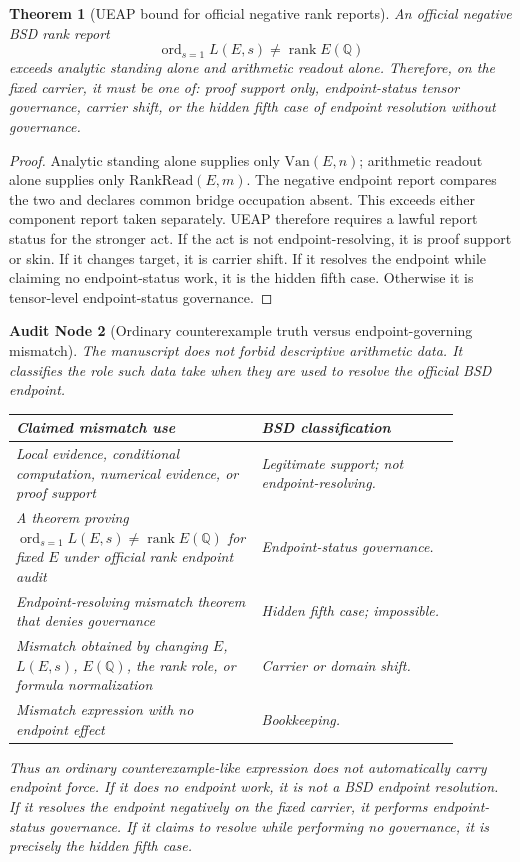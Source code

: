 \documentclass[11pt]{article}
\newtheorem{theorem}{Theorem}[section]
\newtheorem{audit}[theorem]{Audit Node}
\newcommand{\Q}{\mathbb{Q}}
\newcommand{\rank}{\operatorname{rank}}
\newcommand{\ord}{\operatorname{ord}}
\newcommand{\Van}{\mathrm{Van}}
\newcommand{\RankRead}{\mathrm{RankRead}}
\begin{document}
\begin{theorem}[UEAP bound for official negative rank reports]\label{thm:ueap-mismatch-bound}
An official negative BSD rank report
\[
\ord_{s=1}L(E,s)\neq \rank E(\Q)
\]
exceeds analytic standing alone and arithmetic readout alone. Therefore, on the fixed carrier, it must be one of: proof support only, endpoint-status tensor governance, carrier shift, or the hidden fifth case of endpoint resolution without governance.
\end{theorem}

\begin{proof}
Analytic standing alone supplies only $\Van(E,n)$; arithmetic readout alone supplies only $\RankRead(E,m)$. The negative endpoint report compares the two and declares common bridge occupation absent. This exceeds either component report taken separately. UEAP therefore requires a lawful report status for the stronger act. If the act is not endpoint-resolving, it is proof support or skin. If it changes target, it is carrier shift. If it resolves the endpoint while claiming no endpoint-status work, it is the hidden fifth case. Otherwise it is tensor-level endpoint-status governance.
\end{proof}


\begin{audit}[Ordinary counterexample truth versus endpoint-governing mismatch]
The manuscript does not forbid descriptive arithmetic data. It classifies the role such data take when they are used to resolve the official BSD endpoint.
\begin{center}
\begin{tabular}{L{0.48\linewidth}L{0.40\linewidth}}
\toprule
\textbf{Claimed mismatch use} & \textbf{BSD classification}\\
\midrule
Local evidence, conditional computation, numerical evidence, or proof support & Legitimate support; not endpoint-resolving.\\
A theorem proving $\ord_{s=1}L(E,s)\neq \rank E(\Q)$ for fixed $E$ under official rank endpoint audit & Endpoint-status governance.\\
Endpoint-resolving mismatch theorem that denies governance & Hidden fifth case; impossible.\\
Mismatch obtained by changing $E$, $L(E,s)$, $E(\Q)$, the rank role, or formula normalization & Carrier or domain shift.\\
Mismatch expression with no endpoint effect & Bookkeeping.\\
\bottomrule
\end{tabular}
\end{center}
Thus an ordinary counterexample-like expression does not automatically carry endpoint force. If it does no endpoint work, it is not a BSD endpoint resolution. If it resolves the endpoint negatively on the fixed carrier, it performs endpoint-status governance. If it claims to resolve while performing no governance, it is precisely the hidden fifth case.
\end{audit}
\end{document}
